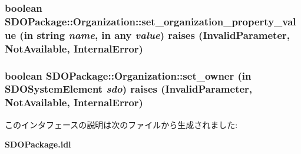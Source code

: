 \subsubsection[{set\_\-organization\_\-property\_\-value}]{\setlength{\rightskip}{0pt plus 5cm}boolean SDOPackage::Organization::set\_\-organization\_\-property\_\-value (in string {\em name}, \/  in any {\em value})  raises (InvalidParameter, NotAvailable, InternalError)}\label{interfaceSDOPackage_1_1Organization_a4d38682f8fdd019d229aee109f2de1f1}
\subsubsection[{set\_\-owner}]{\setlength{\rightskip}{0pt plus 5cm}boolean SDOPackage::Organization::set\_\-owner (in {\bf SDOSystemElement} {\em sdo})  raises (InvalidParameter, NotAvailable, InternalError)}\label{interfaceSDOPackage_1_1Organization_a8b747ff46647c4d2e28df2e9b9de325b}


このインタフェースの説明は次のファイルから生成されました:\begin{DoxyCompactItemize}
\item 
{\bf SDOPackage.idl}\end{DoxyCompactItemize}
